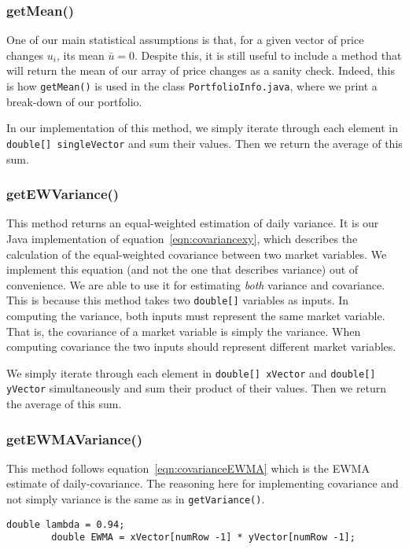 \documentclass[../Dissertation.tex]{subfiles}
\begin{document}
\subsubsection{getMean()}

One of our main statistical assumptions is that, for a given vector of price changes $u_i$, its mean $\bar{u} = 0$.
Despite this, it is still useful to include a method that will return the mean of our array of price changes as a sanity check.
Indeed, this is how \lstinline|getMean()| is used in the class \lstinline|PortfolioInfo.java|, where we print a break-down of our portfolio.

In our implementation of this method, we simply iterate through each element in \lstinline|double[] singleVector| and sum their values.
Then we return the average of this sum.

\subsubsection{getEWVariance()}
This method returns an equal-weighted estimation of daily variance.
It is our Java implementation of equation~\ref{eqn:covariancexy}, which describes the calculation of the equal-weighted covariance between two market variables.
We implement this equation (and not the one that describes variance) out of convenience.
We are able to use it for estimating \textit{both} variance and covariance.
This is because this method takes two \lstinline|double[]| variables as inputs.
In computing the variance, both inputs must represent the same market variable.
That is, the covariance of a market variable is simply the variance.
When computing covariance the two inputs should represent different market variables. 

We simply iterate through each element in \lstinline|double[] xVector| and \lstinline|double[] yVector| simultaneously and sum their product of their values.
Then we return the average of this sum.

\subsubsection{getEWMAVariance()}

This method follows equation~\ref{eqn:covarianceEWMA} which is the EWMA estimate of daily-covariance. 
The reasoning here for implementing covariance and not simply variance is the same as in \lstinline|getVariance()|.
\begin{lstlisting}[firstnumber = 45]
        double lambda = 0.94;
        double EWMA = xVector[numRow -1] * yVector[numRow -1];	
\end{lstlisting}
\end{document}
